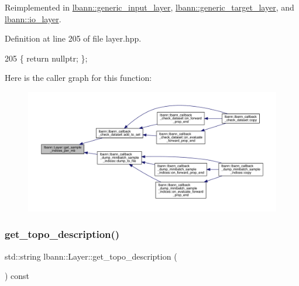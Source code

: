 Reimplemented in \hyperlink{classlbann_1_1generic__input__layer_a749741781204b17c8ca172a9a405a90e}{lbann\+::generic\+\_\+input\+\_\+layer}, \hyperlink{classlbann_1_1generic__target__layer_a9673d3fb3db6ecaae979886178b785ea}{lbann\+::generic\+\_\+target\+\_\+layer}, and \hyperlink{classlbann_1_1io__layer_ab319ad5697e002072ee03e8c64523fb5}{lbann\+::io\+\_\+layer}.



Definition at line 205 of file layer.\+hpp.


\begin{DoxyCode}
205 \{ \textcolor{keywordflow}{return} \textcolor{keyword}{nullptr}; \};
\end{DoxyCode}
Here is the caller graph for this function\+:\nopagebreak
\begin{figure}[H]
\begin{center}
\leavevmode
\includegraphics[width=350pt]{classlbann_1_1Layer_a0ac13af6f5ee8316d64c550bef919ee0_icgraph}
\end{center}
\end{figure}
\mbox{\label{classlbann_1_1Layer_a147a7f7dcf0027a60f10109439e5dcea}} 
\subsubsection{\texorpdfstring{get\+\_\+topo\+\_\+description()}{get\_topo\_description()}}
{\footnotesize\ttfamily std\+::string lbann\+::\+Layer\+::get\+\_\+topo\+\_\+description (\begin{DoxyParamCaption}{ }\end{DoxyParamCaption}) const\hspace{0.3cm}{\ttfamily [virtual]}}

